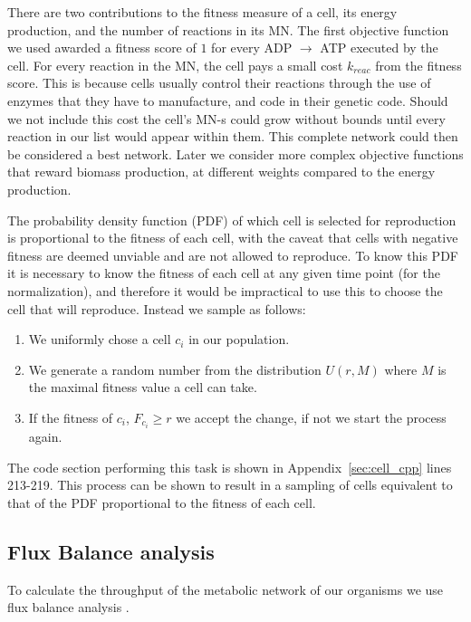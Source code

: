 \documentclass[a4paper,12pt]{article}
\begin{document}
There are two contributions to the fitness measure of a cell, its energy production, and the number of reactions in its MN. The first objective function we used awarded a fitness score of $1$ for every ADP $\rightarrow$ ATP executed by the cell. For every reaction in the MN, the cell pays a small cost $k_{reac}$ from the fitness score. This is because cells usually control their reactions through the use of enzymes that they have to manufacture, and code in their genetic code. Should we not include this cost the cell's MN-s could grow without bounds until every reaction in our list would appear within them. This complete network could then be considered a best network. Later we consider more complex objective functions that reward biomass production, at different weights compared to the energy production. 

The probability density function (PDF) of which cell is selected for reproduction is proportional to the fitness of each cell, with the caveat that cells with negative fitness are deemed unviable and are not allowed to reproduce. To know this PDF it is necessary to know the fitness of each cell at any given time point (for the normalization), and therefore it would be impractical to use this to choose the cell that will reproduce. Instead we sample as follows: 
\begin{enumerate}
	\item We uniformly chose a cell $c_i$ in our population.
	\item We generate a random number from the distribution $U \left( r,M \right)$ where $M$ is the maximal fitness value a cell can take.
	\item If the fitness of $c_i$, $F_{c_i} \geq r$ we accept the change, if not we start the process again.
\end{enumerate}

The code section performing this task is shown in Appendix~\ref{sec:cell_cpp} lines 213-219. This process can be shown to result in a sampling of cells equivalent to that of the PDF proportional to the fitness of each cell.


\subsection{Flux Balance analysis}
\label{sub:Flux Balance analysis}


	To calculate the throughput of the metabolic network of our organisms we use flux balance analysis \cite{whatisfluxbalance}. 	
\end{document}
